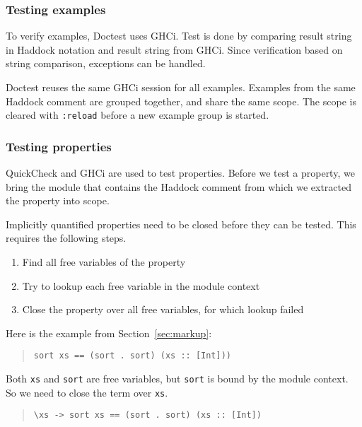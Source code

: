 \documentclass[preprint]{sigplanconf}
\begin{document}
\subsubsection{Testing examples}

To verify examples, Doctest uses GHCi.
Test is done by comparing result string in Haddock notation and
result string from GHCi.
Since verification based on string comparison, exceptions can be handled.

Doctest reuses the same GHCi session for all examples.
Examples from the same Haddock comment are grouped together,
and share the same scope.
The scope is cleared with \verb|:reload| before a new
example group is started.

\subsubsection{Testing properties}

\noindent QuickCheck and GHCi are used to test properties.  Before we
test a property, we bring the module that contains the Haddock comment
from which we extracted the property into scope.

Implicitly quantified properties need to be closed before they can be
tested.  This requires the following steps.
\begin{enumerate}
    \item
        Find all free variables of the property
    \item
        Try to lookup each free variable in the module context
    \item
        Close the property over all free variables, for which lookup
        failed
\end{enumerate}

\noindent Here is the example from Section~\ref{sec:markup}:

\begin{quote}
\small
\begin{verbatim}
sort xs == (sort . sort) (xs :: [Int]))
\end{verbatim}
\end{quote}

\noindent Both \verb|xs| and \verb|sort| are free variables, but
\verb|sort| is bound by the module context.  So we need to close the
term over \verb|xs|.

\begin{quote}
\small
\begin{verbatim}
\xs -> sort xs == (sort . sort) (xs :: [Int])
\end{verbatim}
\end{quote}
\end{document}
